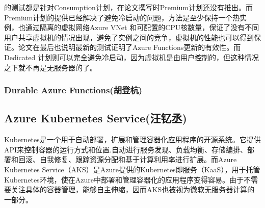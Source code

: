 \documentclass[11pt]{article}
\begin{document}
\cite{wang2018peeking}的测试都是针对Consumption计划，在论文撰写时Premium计划还没有推出。而Premium计划的提供已经解决了避免冷启动的问题，方法是至少保持一个热实例，也通过隔离的虚拟网络Azure VNet 和可配置的CPU核数量，保证了没有不同用户共享虚拟机的情况出现，避免了实例之间的竞争，虚拟机的性能也可以得到保证。论文在最后也说明最新的测试证明了Azure Functions更新的有效性。而Dedicated 计划则可以完全避免冷启动，因为虚拟机是由用户控制的，但这种情况之下就不再是无服务器的了。
\subsubsection{Durable Azure Functions(胡登杭)}

\subsection{Azure Kubernetes Service(汪钇丞)}
Kubernetes是一个用于自动部署，扩展和管理容器化应用程序的开源系统。它提供API来控制容器的运行方式和位置.自动进行服务发现、负载均衡、存储编排、部署和回滚、自我修复、跟踪资源分配和基于计算利用率进行扩展。而Azure Kubernetes Service（AKS）是Azure提供的Kubernetes即服务（KaaS），用于托管Kubernetes环境，使在Azure中部署和管理容器化的应用程序变得容易。由于不需要关注具体的容器管理，能够自主伸缩，因而AKS也被视为微软无服务器计算的一部分。
\end{document}
